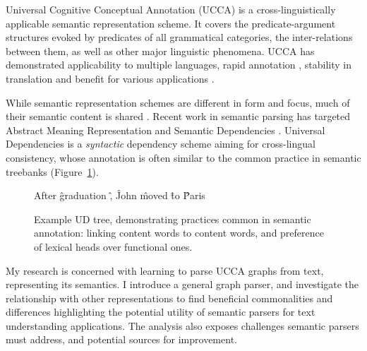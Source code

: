 \documentclass[12pt]{report}
\begin{document}
Universal Cognitive Conceptual Annotation (UCCA)
is a cross-linguistically applicable semantic representation scheme.
It covers the predicate-argument
structures evoked by predicates of all grammatical categories, the inter-relations between them,
as well as other major linguistic phenomena.
UCCA has demonstrated applicability to multiple languages,
rapid annotation \citep{abend2017uccaapp},
stability in translation \citep{sulem2015conceptual}
and benefit for various applications
\citep{birch2016hume,choshen2018usim,sulem2018samsa,sulem2018simple}.

While semantic representation schemes are different in form and focus,
much of their semantic content is shared \citep{abend2017state}.
Recent work in semantic parsing has targeted
Abstract Meaning Representation \citep{banarescu2013abstract} and
Semantic Dependencies \citep{oepen2016towards}.
Universal Dependencies \citep{nivre2016universal}
is a \textit{syntactic} dependency scheme aiming for cross-lingual consistency,
whose annotation is often similar to the common practice in semantic treebanks
(Figure~\ref{fig:original_example_ud}).

\begin{figure}[t]
  \centering
    \begin{dependency}[text only label, label style={above,font=\tt}, font=\small]
    \begin{deptext}[column sep=.8em,ampersand replacement=\^]
    After \^ graduation \^ , \^ John \^ moved \^ to \^ Paris \\
    \end{deptext}
    \end{dependency}
\caption{Example UD tree, demonstrating practices common in semantic annotation:
linking content words to content words, and preference of lexical heads over functional ones.
\label{fig:original_example_ud}}
\end{figure}

My research is concerned with learning to parse UCCA graphs from text, representing its semantics.
I introduce a general graph parser,
and investigate the relationship with other representations to find beneficial commonalities and
differences highlighting the potential utility of semantic parsers for text understanding applications.
The analysis also exposes challenges semantic parsers must address,
and potential sources for improvement.
\end{document}
